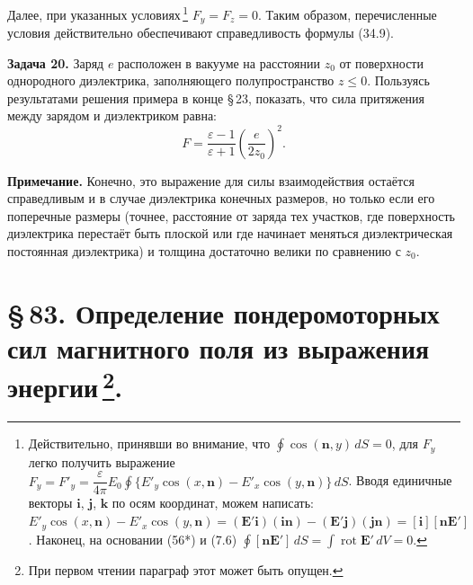 \documentclass[a4paper,10pt]{article}
\begin{document}
Далее, при указанных условиях\,\footnote{Действительно, принявши во
внимание, что $\oint\cos(\mathbf{n},y)\,dS = 0$, для $F_y$ легко
получить выражение
$F_y = F'_y = \dfrac{\varepsilon}{4\pi}E_0\oint\{E'_y\cos(x,\mathbf{n})
- E'_x\cos(y,\mathbf{n})\}\,dS$.
Вводя единичные векторы $\mathbf{i}$, $\mathbf{j}$, $\mathbf{k}$
по осям координат, можем написать:
$E'_y\cos(x,\mathbf{n}) - E'_x\cos(y,\mathbf{n})
= (\mathbf{E}'\mathbf{i})(\mathbf{i}\mathbf{n}) - (\mathbf{E}'\mathbf{j})(\mathbf{j}\mathbf{n})
= [\mathbf{i}][\mathbf{n}\mathbf{E}']$.
Наконец, на основании (56*) и (7.6)
$\oint[\mathbf{n}\mathbf{E}']\,dS = \int\operatorname{rot}\mathbf{E}'\,dV = 0$.}
$F_y = F_z = 0$. Таким образом, перечисленные условия действительно
обеспечивают справедливость формулы (34.9).

\medskip
\noindent\textbf{Задача 20.} Заряд $e$ расположен в вакууме на расстоянии
$z_0$ от поверхности однородного диэлектрика, заполняющего полупространство
$z \leqslant 0$. Пользуясь результатами решения примера в конце §\,23,
показать, что сила притяжения между зарядом и диэлектриком равна:
$$
    F = \frac{\varepsilon - 1}{\varepsilon + 1}\left(\frac{e}{2z_0}\right)^2.
$$

\textbf{Примечание.} Конечно, это выражение для силы взаимодействия
остаётся справедливым и в случае диэлектрика конечных размеров, но
только если его поперечные размеры (точнее, расстояние от заряда тех
участков, где поверхность диэлектрика перестаёт быть плоской или где
начинает меняться диэлектрическая постоянная диэлектрика) и толщина
достаточно велики по сравнению с $z_0$.


\section*{\S\,83. Определение пондеромоторных сил магнитного поля
из выражения энергии\,\footnote{При первом чтении параграф этот может
быть опущен.}.}



\end{document}

